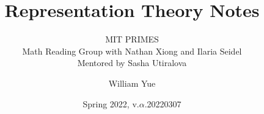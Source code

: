 \documentclass[11pt, oneside]{scrbook}
\begin{document}
\title{Representation Theory Notes}
\subtitle{MIT PRIMES\\
Math Reading Group with Nathan Xiong and Ilaria Seidel\\
Mentored by Sasha Utiralova}
\author{William Yue}
\date{Spring 2022, v.$\alpha$.20220307}
\maketitle



\end{document}
